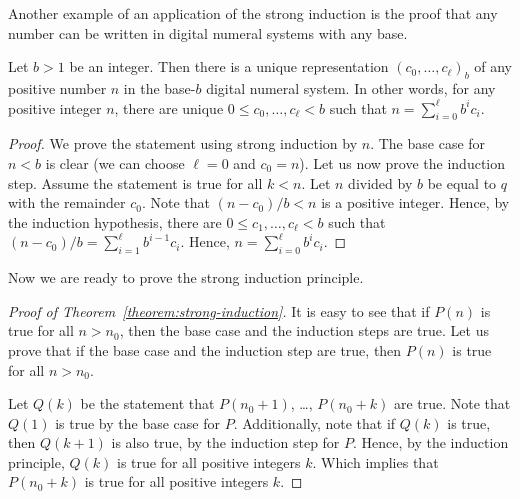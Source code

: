 Another example of an application of the strong induction is the proof that
any number can be written in digital numeral systems with any base.
\begin{theorem}
  Let $b > 1$ be an integer. Then there is a unique representation 
  $(c_0, \dots, c_\ell)_b$ of any positive number $n$ in the base-$b$ digital
  numeral system. 
  In other words, for any positive integer $n$, there are unique 
  $0 \le c_0, \dots, c_\ell < b$ such that $n = \sum_{i = 0}^\ell b^i c_i$.
\end{theorem}
\begin{proof}
  We prove the statement using strong induction by $n$. The base case for
  $n < b$ is clear (we can choose $\ell = 0$ and $c_0 = n$).
  Let us now prove the induction step. Assume the statement is true for all
  $k < n$. Let $n$ divided by $b$ be equal to $q$ with the remainder $c_0$.
  Note that $(n - c_0) / b < n$ is a positive integer. Hence,
  by the induction hypothesis, there are
  $0 \le c_1, \dots, c_\ell < b$
  such that $(n - c_0) / b = \sum_{i = 1}^\ell b^{i - 1} c_i$. Hence,
  $n = \sum_{i = 0}^\ell b^i c_i$.
\end{proof}


Now we are ready to prove the strong induction principle.
\begin{proof}[Proof of Theorem~\ref{theorem:strong-induction}]
  It is easy to see that if $P(n)$ is true for all $n > n_0$, then the base
  case and the induction steps are true. Let us prove that if the base case and
  the induction step are true, then $P(n)$ is true for all $n > n_0$.

  Let $Q(k)$ be the statement that $P(n_0 + 1)$, \dots, $P(n_0 + k)$ are true.
  Note that $Q(1)$ is true by the base case for $P$. Additionally, note that if
  $Q(k)$ is true, then $Q(k + 1)$ is also true, by the induction step for $P$.
  Hence, by the induction principle, $Q(k)$ is true for all positive integers
  $k$. Which implies that $P(n_0 + k)$ is true for all positive integers $k$.
\end{proof}



